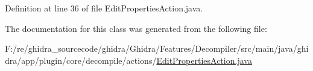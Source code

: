 Definition at line 36 of file Edit\+Properties\+Action.\+java.



The documentation for this class was generated from the following file\+:\begin{DoxyCompactItemize}
\item 
F\+:/re/ghidra\+\_\+sourcecode/ghidra/\+Ghidra/\+Features/\+Decompiler/src/main/java/ghidra/app/plugin/core/decompile/actions/\mbox{\hyperlink{_edit_properties_action_8java}{Edit\+Properties\+Action.\+java}}\end{DoxyCompactItemize}
